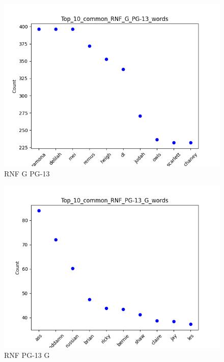\documentclass[a4paper]{article}
\begin{document}
\begin{figure}[ht]
    \centering
    \includegraphics[width=1\textwidth]{../stats/Top_10_common_RNF_G_PG-13_words.png}
    \caption{RNF G PG-13}
\end{figure}


\begin{figure}[ht]
    \centering
    \includegraphics[width=1\textwidth]{../stats/Top_10_common_RNF_PG-13_G_words.png}
    \caption{RNF PG-13 G}
\end{figure}
\end{document}
